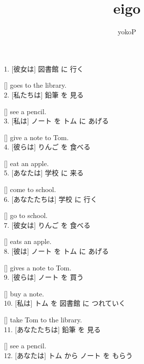 \documentclass[uplatex,
paper=a4,
fontsize=18pt,
jafontsize=16pt,
number_of_lines=30,
line_length=30zh,
baselineskip=25pt,
]{jlreq}
\author{yokoP}
\title{eigo}
\begin{document}
1.  [彼女は] 図書館 に 行く

  [\hspace{3em}] goes to the library.
\\

2.  [私たちは] 鉛筆 を 見る

  [\hspace{3em}] see a pencil.
\\

3.  [私は] ノート を トム に あげる

  [\hspace{3em}] give a note to Tom.
\\

4.  [彼らは] りんご を 食べる

  [\hspace{3em}] eat an apple.
\\

5.  [あなたは] 学校 に 来る

  [\hspace{3em}] come to school.
\\

6.  [あなたたちは] 学校 に 行く

  [\hspace{3em}] go to school.
\\

7.  [彼女は] りんご を 食べる

  [\hspace{3em}] eats an apple.
\\

8.  [彼は] ノート を トム に あげる

  [\hspace{3em}] gives a note to Tom.
\\

9.  [彼らは] ノート を 買う

  [\hspace{3em}] buy a note.
\\

10.  [私は] トム を 図書館 に つれていく

  [\hspace{3em}] take Tom to the library.
\\

11.  [あなたたちは] 鉛筆 を 見る

  [\hspace{3em}] see a pencil.
\\

12.  [あなたは] トム から ノート を もらう
\end{document}
